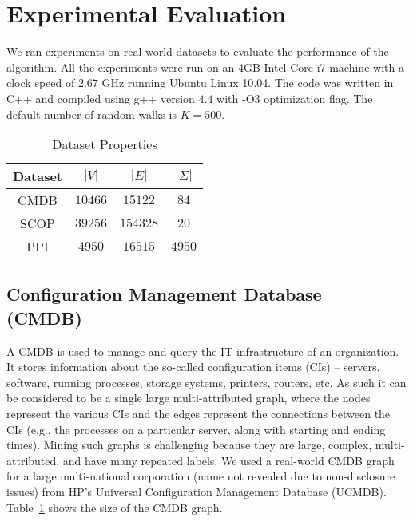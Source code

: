 \section{ Experimental Evaluation} 

We ran experiments on real world datasets to
evaluate the performance of the algorithm. All the experiments were run
on an 4GB Intel Core i7 machine with a clock speed of $2.67$ GHz running
Ubuntu Linux 10.04. The code was written in C++ and 
compiled using g++ version $4.4$ with -O3
optimization flag. The default number of random walks is $K=500$.

\begin{table}[!h]
  \centering
    \begin{tabular}{|c|c|c|c|}
      \hline
      Dataset & $|V|$ & $|E|$ & $|\Sigma|$ \\
      \hline
      CMDB & $10466$ & $15122$ & $84$ \\
      SCOP & $39256$ & $154328$ & $20$ \\
      PPI & $4950$ & $16515$ & $4950$ \\
	  \hline
    \end{tabular}
    \caption{Dataset Properties}
	\label{tab:db}
\end{table}


\subsection{Configuration Management Database\\ (CMDB)} 

A CMDB is used to manage and query the IT infrastructure of an
organization. It stores information about the so-called configuration
items (CIs) -- servers, software, running processes, storage systems,
printers, routers, etc. As such it can be considered to be a single
large multi-attributed graph, where the nodes represent the various CIs
and the edges represent the connections between the CIs (e.g., the
processes on a particular server, along with starting and ending times).
Mining such graphs is challenging because they are large, complex,
multi-attributed, and have many repeated labels.  We used a real-world
CMDB graph for a large multi-national corporation (name not revealed due
to non-disclosure issues) from HP's Universal Configuration Management
Database (UCMDB).  Table~\ref{tab:db} shows the size of the CMDB graph. 


